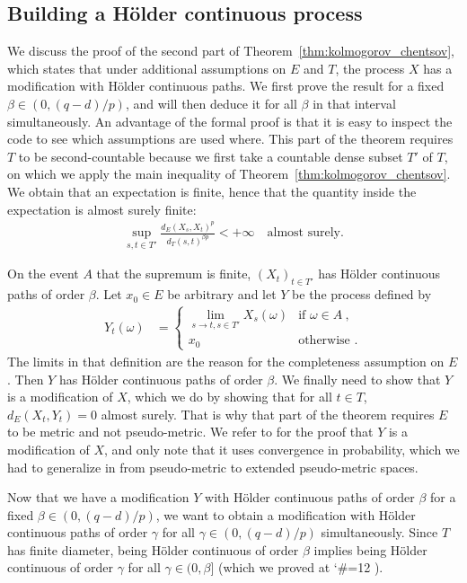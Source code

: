 \documentclass[lean]{Draft}
\makeatletter
\newcommand\leanlink{\begingroup\catcode`\#=12\relax\@leanlink}
\newcommand\@leanlink[2]{\endgroup
\href{#1}
{\texttt{\detokenize{#2}}}}
\newcommand{\docs}[1]{%
\leanlink{https://remydegenne.github.io/brownian-motion/docs/find/?pattern=#1\#doc}
{#1}}
\makeatother
\begin{document}
\subsection{Building a Hölder continuous process}
\label{sub:holder_process}

We discuss the proof of the second part of Theorem~\ref{thm:kolmogorov_chentsov}, which states that under additional assumptions on $E$ and $T$, the process $X$ has a modification with Hölder continuous paths.
We first prove the result for a fixed $\beta \in (0, (q - d)/p)$, and will then deduce it for all $\beta$ in that interval simultaneously.
An advantage of the formal proof is that it is easy to inspect the code to see which assumptions are used where.
This part of the theorem requires $T$ to be second-countable because we first take a countable dense subset $T'$ of $T$, on which we apply the main inequality of Theorem~\ref{thm:kolmogorov_chentsov}.
We obtain that an expectation is finite, hence that the quantity inside the expectation is almost surely finite:
\begin{align*}
  \sup_{s, t \in T'} \frac{d_E(X_s, X_t)^p}{d_T(s, t)^{\beta p}} < +\infty
  \quad \text{almost surely.}
\end{align*}

On the event $A$ that the supremum is finite, $(X_t)_{t \in T'}$ has Hölder continuous paths of order $\beta$.
Let $x_0 \in E$ be arbitrary and let $Y$ be the process defined by
\begin{align*}
  Y_t(\omega)
  &= \begin{cases}
    \lim_{s \to t, s \in T'} X_s(\omega) & \text{if } \omega \in A \: , \\
    x_0 & \text{otherwise .}
  \end{cases}
\end{align*}
The limits in that definition are the reason for the completeness assumption on $E$.
Then $Y$ has Hölder continuous paths of order $\beta$.
We finally need to show that $Y$ is a modification of $X$, which we do by showing that for all $t \in T$, $d_E(X_t, Y_t) = 0$ almost surely.
That is why that part of the theorem requires $E$ to be metric and not pseudo-metric.
We refer to \cite{kratschmer2023kolmogorov} for the proof that $Y$ is a modification of $X$, and only note that it uses convergence in probability, which we had to generalize in \mathlib from pseudo-metric to extended pseudo-metric spaces.

Now that we have a modification $Y$ with Hölder continuous paths of order $\beta$ for a fixed $\beta \in (0, (q - d)/p)$, we want to obtain a modification with Hölder continuous paths of order $\gamma$ for all $\gamma \in (0, (q - d)/p)$ simultaneously.
Since $T$ has finite diameter, being Hölder continuous of order $\beta$ implies being Hölder continuous of order $\gamma$ for all $\gamma \in (0, \beta]$ (which we proved at \docs{HolderOnWith.mono_right}).
\end{document}

